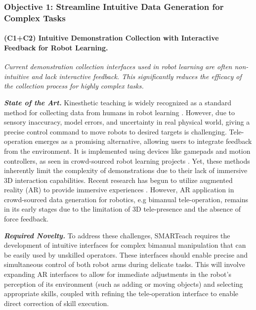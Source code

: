 \documentclass{erc-B2}
\begin{document}
\subsubsection{Objective 1: Streamline Intuitive Data Generation for Complex Tasks}

\paragraph{(C1+C2) Intuitive Demonstration Collection with Interactive Feedback for Robot Learning.}
\textit{Current demonstration collection interfaces used in robot learning are often non-intuitive and lack interactive feedback. This significantly reduces the efficacy of the collection process for highly complex tasks. } 


\textit{\textbf{State of the Art.}} 
Kinesthetic teaching is widely recognized as a standard method for collecting data from humans in robot learning \cite{CITE}. However, due to sensory inaccuracy, model errors, and uncertainty in real physical world, giving a precise control command to move robots to desired targets is challenging. Tele-operation emerges as a promising alternative, allowing users to integrate feedback from the environment. It is implemented using devices like gamepads and motion controllers, as seen in crowd-sourced robot learning projects \cite{mandlekar2018roboturk}. Yet, these methods inherently limit the complexity of demonstrations due to their lack of immersive 3D interaction capabilities. Recent research has begun to utilize augmented reality (AR) to provide immersive experiences \cite{Mullen_Mosier_Chakrabarti_Chen_White_Losey_2021, Rosen_Whitney_Phillips_Chien_Tompkin_Konidaris_Tellex_2020}. However, AR application in crowd-sourced data generation for robotics, e.g bimanual tele-operation, remains in its early stages due to the limitation of 3D tele-presence and the absence of force feedback.


\textit{\textbf{Required Novelty.}} To address these challenges, SMARTeach requires the development of intuitive interfaces for complex bimanual manipulation that can be easily used by unskilled operators. These interfaces should enable precise and simultaneous control of both robot arms during delicate tasks. This will involve expanding AR interfaces to allow for immediate adjustments in the robot's perception of its environment (such as adding or moving objects) and selecting appropriate skills, coupled with refining the tele-operation interface to enable direct correction of skill execution.
\end{document}
